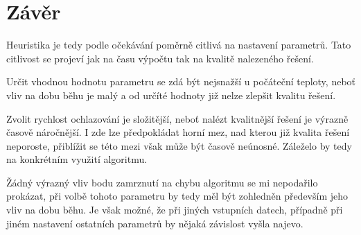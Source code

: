 \documentclass[11pt]{article}
\begin{document}
\section{Závěr}

Heuristika je tedy podle očekávání poměrně citlivá na nastavení parametrů. Tato citlivost se projeví jak na času výpočtu tak na kvalitě nalezeného řešení.

Určit vhodnou hodnotu parametru se zdá být nejsnažší u počáteční teploty, neboť vliv na dobu běhu je malý a od určíté hodnoty již nelze zlepšit kvalitu řešení. 

Zvolit rychlost ochlazování je složitější, neboť nalézt kvalitnější řešení je výrazně časově náročnější. I zde lze předpokládat horní mez, nad kterou již kvalita řešení neporoste, přiblížit se této mezi však může být časově neúnosné. Záleželo by tedy na konkrétním využití algoritmu.

Žádný výrazný vliv bodu zamrznutí na chybu algoritmu se mi nepodařilo prokázat, při volbě tohoto parametru by tedy měl být zohledněn především jeho vliv na dobu běhu. Je však možné, že při jiných vstupních datech, případně při jiném nastavení ostatních parametrů by nějaká závislost vyšla najevo.



\end{document}
